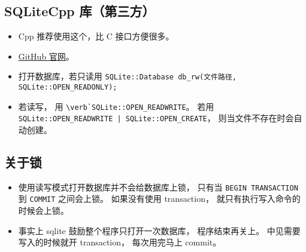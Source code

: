 \subsection{SQLiteCpp 库（第三方）}

\begin{itemize}
\item Cpp 推荐使用这个，比 C 接口方便很多。
\item \href{https://github.com/SRombauts/SQLiteCpp}{GitHub 官网}。
\item 打开数据库，若只读用 \verb|SQLite::Database db_rw(文件路径, SQLite::OPEN_READONLY);|
\item 若读写， 用 \verb|\verb`SQLite::OPEN_READWRITE|。 若用 \verb`SQLite::OPEN_READWRITE | SQLite::OPEN_CREATE`， 则当文件不存在时会自动创建。
\end{itemize}

\subsection{关于锁}
\begin{itemize}
\item 使用读写模式打开数据库并不会给数据库上锁， 只有当 \verb|BEGIN TRANSACTION| 到 \verb|COMMIT| 之间会上锁。 如果没有使用 transaction， 就只有执行写入命令的时候会上锁。
\item 事实上 sqlite 鼓励整个程序只打开一次数据库， 程序结束再关上。 中见需要写入的时候就开 transaction， 每次用完马上 commit。
\end{itemize}
